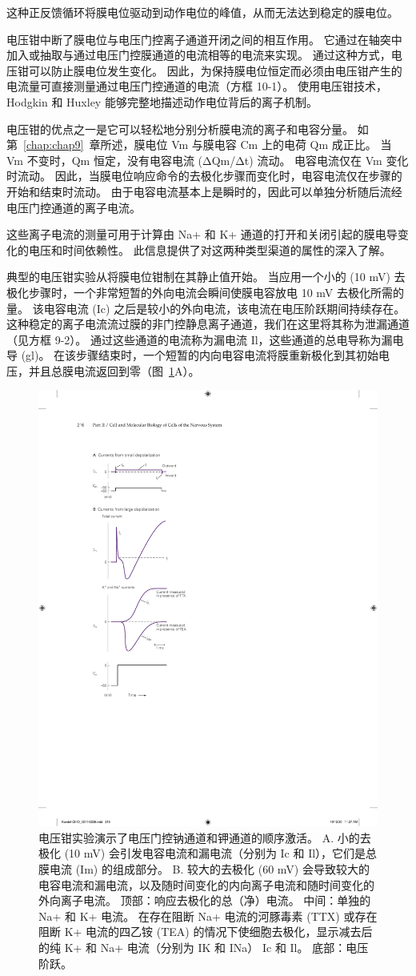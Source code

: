 这种正反馈循环将膜电位驱动到动作电位的峰值，从而无法达到稳定的膜电位。


电压钳中断了膜电位与电压门控离子通道开闭之间的相互作用。
它通过在轴突中加入或抽取与通过电压门控膜通道的电流相等的电流来实现。
通过这种方式，电压钳可以防止膜电位发生变化。
因此，为保持膜电位恒定而必须由电压钳产生的电流量可直接测量通过电压门控通道的电流（方框 10-1）。
使用电压钳技术，Hodgkin 和 Huxley 能够完整地描述动作电位背后的离子机制。


电压钳的优点之一是它可以轻松地分别分析膜电流的离子和电容分量。
如第~\ref{chap:chap9}~章所述，膜电位 Vm 与膜电容 Cm 上的电荷 Qm 成正比。
当 Vm 不变时，Qm 恒定，没有电容电流 (ΔQm/Δt) 流动。
电容电流仅在 Vm 变化时流动。
因此，当膜电位响应命令的去极化步骤而变化时，电容电流仅在步骤的开始和结束时流动。
由于电容电流基本上是瞬时的，因此可以单独分析随后流经电压门控通道的离子电流。


这些离子电流的测量可用于计算由 Na+ 和 K+ 通道的打开和关闭引起的膜电导变化的电压和时间依赖性。
此信息提供了对这两种类型渠道的属性的深入了解。


典型的电压钳实验从将膜电位钳制在其静止值开始。
当应用一个小的 (10 mV) 去极化步骤时，一个非常短暂的外向电流会瞬间使膜电容放电 10 mV 去极化所需的量。
该电容电流 (Ic) 之后是较小的外向电流，该电流在电压阶跃期间持续存在。
这种稳定的离子电流流过膜的非门控静息离子通道，我们在这里将其称为泄漏通道（见方框 9-2）。
通过这些通道的电流称为漏电流 Il，这些通道的总电导称为漏电导 (gl)。
在该步骤结束时，一个短暂的内向电容电流将膜重新极化到其初始电压，并且总膜电流返回到零（图~\ref{fig:10_3}A）。


\begin{figure}[htbp]
	\centering
	\includegraphics[width=0.4\linewidth]{chap10/fig_10_3}
	\caption{电压钳实验演示了电压门控钠通道和钾通道的顺序激活。 A. 小的去极化 (10 mV) 会引发电容电流和漏电流（分别为 Ic 和 Il），它们是总膜电流 (Im) 的组成部分。 B. 较大的去极化 (60 mV) 会导致较大的电容电流和漏电流，以及随时间变化的内向离子电流和随时间变化的外向离子电流。 顶部：响应去极化的总（净）电流。 中间：单独的 Na+ 和 K+ 电流。 在存在阻断 Na+ 电流的河豚毒素 (TTX) 或存在阻断 K+ 电流的四乙铵 (TEA) 的情况下使细胞去极化，显示减去后的纯 K+ 和 Na+ 电流（分别为 IK 和 INa） Ic 和 Il。 底部：电压阶跃。}
	\label{fig:10_3}
\end{figure}


